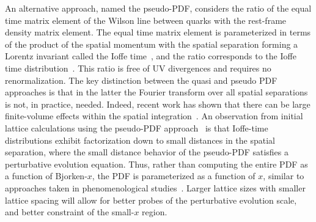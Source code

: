 An alternative approach, named the pseudo-PDF, considers the ratio of the equal time matrix element of the Wilson line between quarks with the rest-frame density matrix element. The equal time matrix element is parameterized in terms of the product of the spatial momentum with the spatial separation forming a Lorentz invariant called the Ioffe time~\cite{Ioffe:1969kf,Braun:1994jq}, and the ratio corresponds to the Ioffe time distribution~\cite{Radyushkin:2016hsy,Radyushkin:2017cyf}.
This ratio is free of UV divergences and requires no renormalization. The key distinction between the quasi and pseudo PDF approaches is that in the latter the Fourier transform over all spatial separations is not, in practice, needed. Indeed, recent work has shown that there can be large finite-volume effects within the spatial integration~\cite{Briceno:2018lfj}. An observation from initial lattice calculations using the pseudo-PDF approach~\cite{Karpie:2018zaz,Karpie:2018zaz}  is that Ioffe-time distributions exhibit factorization down to small distances in the spatial separation, where the small distance behavior of the pseudo-PDF  satisfies a perturbative  evolution equation. Thus, rather than computing the entire PDF as a function of Bjorken-$x$, the PDF is parameterized as a function of $x$, similar to approaches taken in phenomenological studies~\cite{Ball:2017nwa,Accardi:2016qay}. Larger lattice sizes with smaller lattice spacing will allow for better probes of the perturbative evolution scale, and better constraint of the small-$x$ region.


